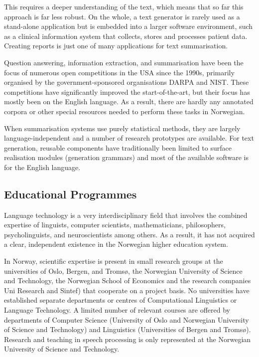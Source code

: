 \begin{multicols}{2}

This requires a deeper understanding of the text, which means that so far this approach is far less robust. On the whole, a text generator is rarely used as a stand-alone application but is embedded into a larger software environment, such as a clinical information system that collects, stores and processes patient data. Creating reports is just one of many applications for text summarisation.

Question answering, information extraction, and summarisation have been the focus of numerous open competitions in the USA since the 1990s, primarily organised by the government-sponsored organisations DARPA and NIST. These competitions have significantly improved the start-of-the-art, but their focus has mostly been on the English language. 
As a result, there are hardly any annotated corpora or other special resources needed to perform these tasks in Norwegian. 

When summarisation systems use purely statistical methods, they are largely language-independent and a number of research prototypes are available. 
For text generation, reusable components have traditionally been limited to surface realisation modules (generation grammars) and most of the available software is for the English language.

\subsection{Educational Programmes}

Language technology is a very interdisciplinary field that involves the combined expertise of linguists, computer scientists, mathematicians, philosophers, psycholinguists, and neuroscientists among others. 
As a result, it has not acquired a clear, independent existence in the Norwegian higher education system. 

In Norway, scientific expertise is present in small research groups at the universities of Oslo, Bergen, and Tromsø, the Norwegian University of Science and Technology, the Norwegian School of Economics and the research companies Uni Research and Sintef) that cooperate on a project basis. 
No universities have established separate departments or centres of Computational Linguistics or Language Technology. 
A limited number of relevant courses are offered by departments of Computer Science (University of Oslo and Norwegian University of Science and Technology) and Linguistics (Universities of Bergen and Tromsø). 
Research and teaching in speech processing is only represented at the Norwegian University of Science and Technology. 


\end{multicols}
